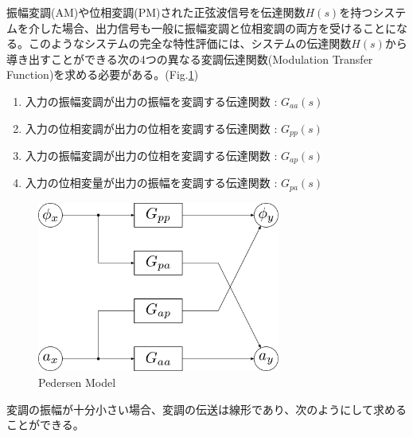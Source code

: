 \documentclass[book]{jlreq}
\begin{document}
振幅変調(AM)や位相変調(PM)された正弦波信号を伝達関数$H(s)$を持つシステムを介した場合、出力信号も一般に振幅変調と位相変調の両方を受けることになる。このようなシステムの完全な特性評価には、システムの伝達関数$H(s)$から導き出すことができる次の4つの異なる変調伝達関数(Modulation Transfer Function)を求める必要がある。(Fig.\ref{fig:PM})
%
\begin{enumerate}
    \item 入力の振幅変調が出力の振幅を変調する伝達関数 : $G_{aa}(s)$
    \item 入力の位相変調が出力の位相を変調する伝達関数 : $G_{pp}(s)$
    \item 入力の振幅変調が出力の位相を変調する伝達関数 : $G_{ap}(s)$
    \item 入力の位相変量が出力の振幅を変調する伝達関数 : $G_{pa}(s)$
\end{enumerate}
%
\begin{figure}[hbt]
    \begin{center}
        \includegraphics[width=8cm,clip]{figs/Pedersen_Model.pdf}
        \caption{Pedersen Model}
        \label{fig:PM}
    \end{center}
\end{figure}
%
変調の振幅が十分小さい場合、変調の伝送は線形であり、次のようにして求めることができる。
\end{document}
